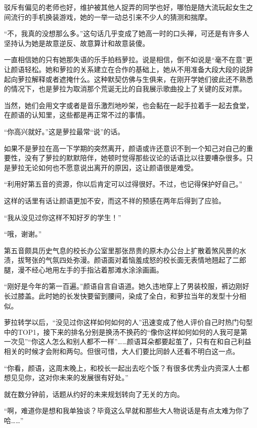 \documentclass[UTF8, scheme = chinese, openany]{ctexbook}
\begin{document}
驳斥有偏见的老师也好，维护被其他人捉弄的同学也好，哪怕是随大流玩起女生之间流行的手机换装游戏，她的一举一动总引来不少人的猜测和揣摩。

“不，我真的没想那么多。”这句话几乎变成了她高一时的口头禅，可还是有许多人坚持认为她是故意逆反、故意算计和故意装傻。

一直相信她的只有她那失语的乐手拍档萝拉。说是相信，倒不如说是“毫不在意”更让颜语轻松。她和萝拉的关系建立在合作的基础上，她从不用准备大段大段的说辞起向萝拉解释或者遮掩什么。这种默契仿佛与生俱来，在刚开学她们彼此还不熟悉的情况下，也是萝拉为取消那个荒诞无比的自我展示歌曲投上了关键的反对票。

当然，她们会用文字或者是音乐激烈地吵架，也会黏在一起手拉着手一起去食堂，在颜语的认知里，这些都是再正常不过的事情。

“你高兴就好。”这是萝拉最常“说”的话。

如果不是萝拉在高一下学期的突然离开，颜语或许还意识不到一个知己对自己的重要性，没有了萝拉的默默陪伴，她顿时觉得那些议论的话语比以往要嘈杂很多。只是萝拉无论如何也不愿意说出离开的原因，这让颜语很是难受。

“利用好第五音的资源，你以后肯定可以过得很好。不过，也记得保护好自己。”

这样的话里有话让颜语更加不安，而这不祥的预感在两年后得到了应验。

\vspace{1.5em}

“我从没见过你这样不知好歹的学生！”

“哦，谢谢。”

第五音颇具历史气息的校长办公室里那张昂贵的原木办公台上扩散着煞风景的水渍，拔弩张的气氛四处弥漫。颜语面对着恼羞成怒的校长面无表情地翘起了二郎腿，漫不经心地用左手的手指沾着那滩水涂涂画画。

“刚好是今年的第一百遍。”颜语自言自语道。她久违地穿上了男装校服，裤边刚好长过膝盖。此时她的长发快要留到腰间，染成了全白，和萝拉当年的发型十分相似。

萝拉转学以后，“没见过你这样如何如何的人”迅速变成了他人评价自己时热门句型中的TOP1，接下来的排名分别是换汤不换药的“像你这样如何如何的人我可是第一次见”“你这人怎么和别人都不一样”……颜语耳朵都要起茧了，只有在和自己利益相关的时候才会附和两句。但很可惜，大人们要比同龄人还看不明白这一点。

“你看，颜语，这周末晚上，和校长一起出去吃个饭？有很多优秀业内资深人士都想见见你，这对你未来的发展很有好处。”

就在数分钟前，话题从约好的未来规划转向了无关的方向。

“啊，难道你是想和我单独谈？毕竟这么早就和那些大人物说话是有点太难为你了哈……”
\end{document}
